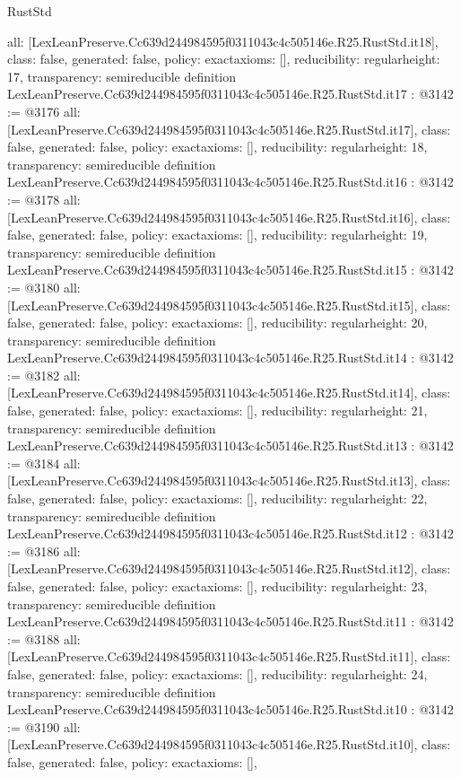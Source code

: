 \begin{lexlean}{RustStd}
\begin{coremodule}
{  all: [LexLeanPreserve.Cc639d244984595f0311043c4c505146e.R25.RustStd.it18],
  class: false,
  generated: false,
  policy: exact{axioms: []},
  reducibility: regular{height: 17},
  transparency: semireducible
}
definition LexLeanPreserve.Cc639d244984595f0311043c4c505146e.R25.RustStd.it17 : @3142 := @3176 {
  all: [LexLeanPreserve.Cc639d244984595f0311043c4c505146e.R25.RustStd.it17],
  class: false,
  generated: false,
  policy: exact{axioms: []},
  reducibility: regular{height: 18},
  transparency: semireducible
}
definition LexLeanPreserve.Cc639d244984595f0311043c4c505146e.R25.RustStd.it16 : @3142 := @3178 {
  all: [LexLeanPreserve.Cc639d244984595f0311043c4c505146e.R25.RustStd.it16],
  class: false,
  generated: false,
  policy: exact{axioms: []},
  reducibility: regular{height: 19},
  transparency: semireducible
}
definition LexLeanPreserve.Cc639d244984595f0311043c4c505146e.R25.RustStd.it15 : @3142 := @3180 {
  all: [LexLeanPreserve.Cc639d244984595f0311043c4c505146e.R25.RustStd.it15],
  class: false,
  generated: false,
  policy: exact{axioms: []},
  reducibility: regular{height: 20},
  transparency: semireducible
}
definition LexLeanPreserve.Cc639d244984595f0311043c4c505146e.R25.RustStd.it14 : @3142 := @3182 {
  all: [LexLeanPreserve.Cc639d244984595f0311043c4c505146e.R25.RustStd.it14],
  class: false,
  generated: false,
  policy: exact{axioms: []},
  reducibility: regular{height: 21},
  transparency: semireducible
}
definition LexLeanPreserve.Cc639d244984595f0311043c4c505146e.R25.RustStd.it13 : @3142 := @3184 {
  all: [LexLeanPreserve.Cc639d244984595f0311043c4c505146e.R25.RustStd.it13],
  class: false,
  generated: false,
  policy: exact{axioms: []},
  reducibility: regular{height: 22},
  transparency: semireducible
}
definition LexLeanPreserve.Cc639d244984595f0311043c4c505146e.R25.RustStd.it12 : @3142 := @3186 {
  all: [LexLeanPreserve.Cc639d244984595f0311043c4c505146e.R25.RustStd.it12],
  class: false,
  generated: false,
  policy: exact{axioms: []},
  reducibility: regular{height: 23},
  transparency: semireducible
}
definition LexLeanPreserve.Cc639d244984595f0311043c4c505146e.R25.RustStd.it11 : @3142 := @3188 {
  all: [LexLeanPreserve.Cc639d244984595f0311043c4c505146e.R25.RustStd.it11],
  class: false,
  generated: false,
  policy: exact{axioms: []},
  reducibility: regular{height: 24},
  transparency: semireducible
}
definition LexLeanPreserve.Cc639d244984595f0311043c4c505146e.R25.RustStd.it10 : @3142 := @3190 {
  all: [LexLeanPreserve.Cc639d244984595f0311043c4c505146e.R25.RustStd.it10],
  class: false,
  generated: false,
  policy: exact{axioms: []},
}
\end{coremodule}
\end{lexlean}

